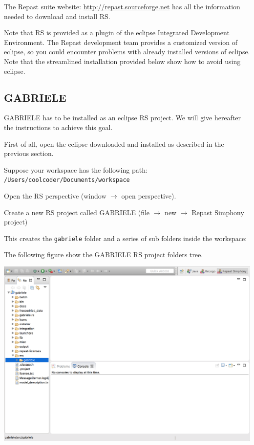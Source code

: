 \documentclass{book}
\begin{document}
The Repast suite website: \url{http://repast.sourceforge.net} has all the information needed to download and install RS.

Note that RS is provided as a plugin of the eclipse Integrated Development Environment. The Repast development team provides a customized version of eclipse, so you could encounter problems with already installed versions of eclipse. Note that the streamlined installation provided below show how to avoid using eclipse.

\subsection{GABRIELE}

GABRIELE has to be installed as an eclipse RS project. We will give hereafter the instructions to achieve this goal.

First of all, open the eclipse downloaded and installed as described in the previous section.

Suppose your workspace has the following path:\\
\verb+/Users/coolcoder/Documents/workspace+

Open the RS perspective (window $\rightarrow$ open perspective).

Create a new RS project called GABRIELE (file $\rightarrow$ new $\rightarrow$ Repast Simphony project)

This creates the \verb+gabriele+ folder and a series of sub folders inside the workspace:

The following figure show the GABRIELE RS project folders tree.

\vskip2mm
\noindent
\includegraphics[scale=0.35]{fig_gabriele_rs_navigation}
\end{document}
